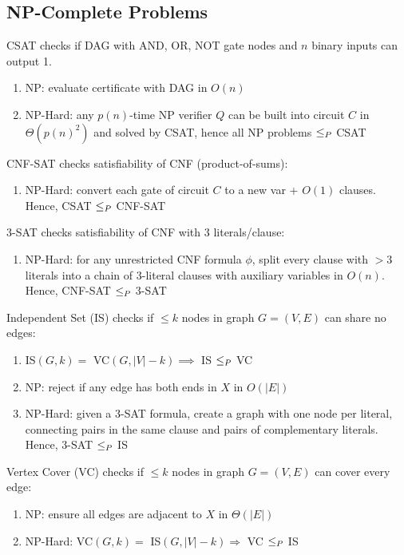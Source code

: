 \documentclass[12pt, a4paper]{article}
\begin{document}
\begin{multicols*}{3}
\subsection*{NP-Complete Problems}
CSAT checks if DAG with AND, OR, NOT gate nodes and $n$ binary inputs can output 1.
\begin{enumerate}[\roman*]
  \item NP: evaluate certificate with DAG in $O(n)$
  \item NP-Hard: any $p(n)$-time NP verifier $Q$ can be built into circuit $C$ in $\Theta(p(n)^2)$ and solved by CSAT, hence all NP problems $\leq_{P}$ CSAT  
\end{enumerate}

CNF-SAT checks satisfiability of CNF (product-of-sums):
\begin{enumerate}[\roman*]
  \item NP-Hard: convert each gate of circuit $C$ to a new var + $O(1)$ clauses. Hence, CSAT $\leq_{P}$ CNF-SAT 
\end{enumerate}

3-SAT checks satisfiability of CNF with 3 literals/clause:
\begin{enumerate}[\roman*]
  \item NP-Hard: for any unrestricted CNF formula $\phi$, split every clause with $>3$ literals into a chain of 3-literal clauses with auxiliary variables in $O(n)$. Hence, CNF-SAT $\leq_{P}$ 3-SAT
\end{enumerate}

Independent Set (IS) checks if $\leq k$ nodes in graph $G=(V, E)$ can share no edges:
\begin{enumerate}[\roman*.]
  \item IS$(G, k) =$ VC$(G, |V| - k) \implies$ IS $\leq_{P}$ VC
  \item NP: reject if any edge has both ends in $X$ in $O(|E|)$
  \item NP-Hard: given a 3-SAT formula, create a graph with one node per literal, connecting pairs in the same clause and pairs of complementary literals. Hence, 3-SAT $\leq_{P}$ IS 
\end{enumerate}

Vertex Cover (VC) checks if $\leq k$ nodes in graph $G=(V, E)$ can cover every edge:
\begin{enumerate}[\roman*.]
  \item NP: ensure all edges are adjacent to $X$ in $\Theta(|E|)$
  \item NP-Hard: VC$(G, k) =$ IS$(G, |V| - k) \Rightarrow$ VC $\leq_{P}$ IS
\end{enumerate}


\end{multicols*}
\end{document}
